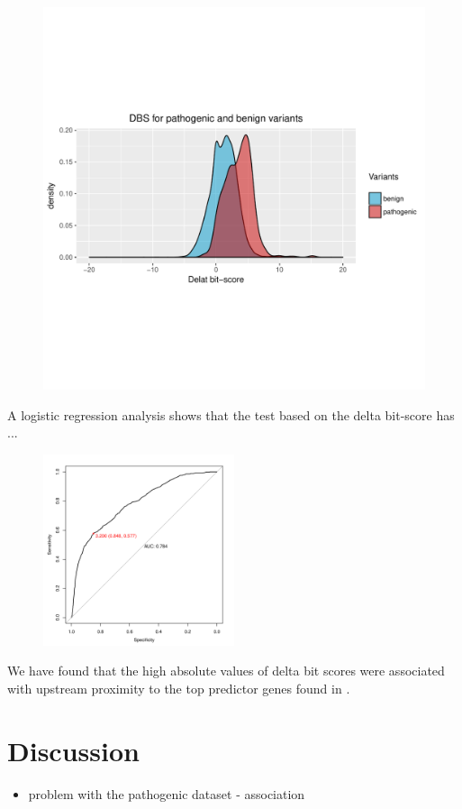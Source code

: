 \documentclass[12pt,article]{article}
\begin{document}
\begin{figure}
\includegraphics{../Human_Harrys_data/plots/DBscore_densities_ggplot_within20.pdf}
\label{densities}
\end{figure}

A logistic regression analysis shows that the test based on the delta bit-score has ...

\begin{figure}
\includegraphics[width=0.5\textwidth]{../Human_Harrys_data/ROCcurve.pdf}
\end{figure}

We have found that the high absolute values of delta bit scores were associated with upstream proximity to the top predictor genes found in \citet{wheeler2018machine}. 






\section{Discussion}

\begin{itemize}
\item problem with the pathogenic dataset - association
\end{itemize}

 

\end{document}
